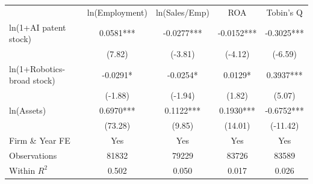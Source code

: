 \begin{tabular}{lcccc}
\toprule
 & ln(Employment) & ln(Sales/Emp) & ROA & Tobin's Q \\
\cmidrule(lr){2-5}
ln(1+AI patent stock) & 0.0581*** & -0.0277*** & -0.0152*** & -0.3025*** \\
 & (7.82) & (-3.81) & (-4.12) & (-6.59) \\[3pt]
ln(1+Robotics-broad stock) & -0.0291* & -0.0254* & 0.0129* & 0.3937*** \\
 & (-1.88) & (-1.94) & (1.82) & (5.07) \\[3pt]
ln(Assets) & 0.6970*** & 0.1122*** & 0.1930*** & -0.6752*** \\
 & (73.28) & (9.85) & (14.01) & (-11.42) \\[3pt]
\midrule
Firm \& Year FE & Yes & Yes & Yes & Yes \\
Observations & 81832 & 79229 & 83726 & 83589 \\
Within $R^2$ & 0.502 & 0.050 & 0.017 & 0.026 \\
\bottomrule
\end{tabular}